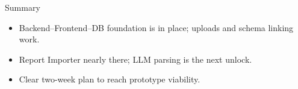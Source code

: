 \documentclass [aspectratio=169]{beamer}
\begin{document}

\begin{frame}{Summary}
\begin{itemize}
    \item Backend–Frontend–DB foundation is in place; uploads and schema linking work.
    \item Report Importer nearly there; LLM parsing is the next unlock.
    \item Clear two-week plan to reach prototype viability.
\end{itemize}
\end{frame}
\end{document}

